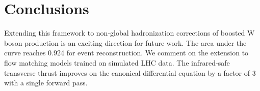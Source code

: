 \section{Conclusions}\label{sec:conclusions}

Extending this framework to non-global hadronization corrections of
boosted W boson production is an exciting direction for future work. The
area under the curve reaches 0.924 for event reconstruction. We comment
on the extension to flow matching models trained on simulated LHC data.
The infrared-safe transverse thrust improves on the canonical
differential equation by a factor of 3 with a single forward pass.

